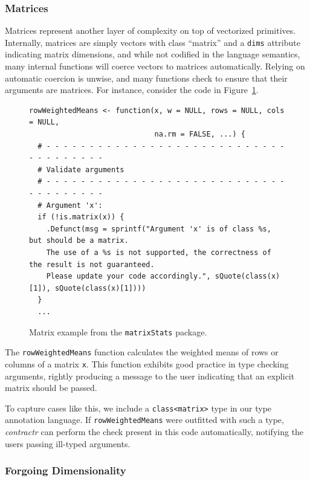 \documentclass[acmsmall,review,anonymous]{acmart}\settopmatter{printfolios=true,printccs=false,printacmref=false}
\newcommand{\code}[1]{{\lstinline[style=Rin]!#1!}\xspace}
\newcommand{\contractr}{\emph{contractr}\xspace} %
\begin{document}
%
%
\subsubsection{Matrices}

Matrices represent another layer of complexity on top of vectorized
primitives.  Internally, matrices are simply vectors with class ``matrix''
and a \code{dims} attribute indicating matrix dimensions, and while not
codified in the language semantics, many internal functions will coerce
vectors to matrices automatically.  Relying on automatic coercion is unwise,
and many functions check to ensure that their arguments are matrices.  For
instance, consider the code in Figure~\ref{fig:matrix-example}.

\begin{figure}[htbp]
\begin{center}

\begin{lstlisting}
rowWeightedMeans <- function(x, w = NULL, rows = NULL, cols = NULL,
                             na.rm = FALSE, ...) {
  # - - - - - - - - - - - - - - - - - - - - - - - - - - - - - - - - - - - - -
  # Validate arguments
  # - - - - - - - - - - - - - - - - - - - - - - - - - - - - - - - - - - - - -
  # Argument 'x':
  if (!is.matrix(x)) {
    .Defunct(msg = sprintf("Argument 'x' is of class %s, but should be a matrix. 
    The use of a %s is not supported, the correctness of the result is not guaranteed. 
    Please update your code accordingly.", sQuote(class(x)[1]), sQuote(class(x)[1])))
  }
  ...
\end{lstlisting}

\caption{Matrix example from the \code{matrixStats} package.}
\label{fig:matrix-example}
\end{center}
\end{figure}

The \code{rowWeightedMeans} function calculates the weighted means of rows
or columns of a matrix \code{x}.  This function exhibits good practice in
type checking arguments, rightly producing a message to the user indicating
that an explicit matrix should be passed.

To capture cases like this, we include a \code{class<matrix>} type in our
type annotation language.  If \code{rowWeightedMeans} were outfitted with
such a type, \contractr can perform the check present in this code
automatically, notifying the users passing ill-typed arguments.

%
%
\subsubsection{Forgoing Dimensionality} 
\end{document}
